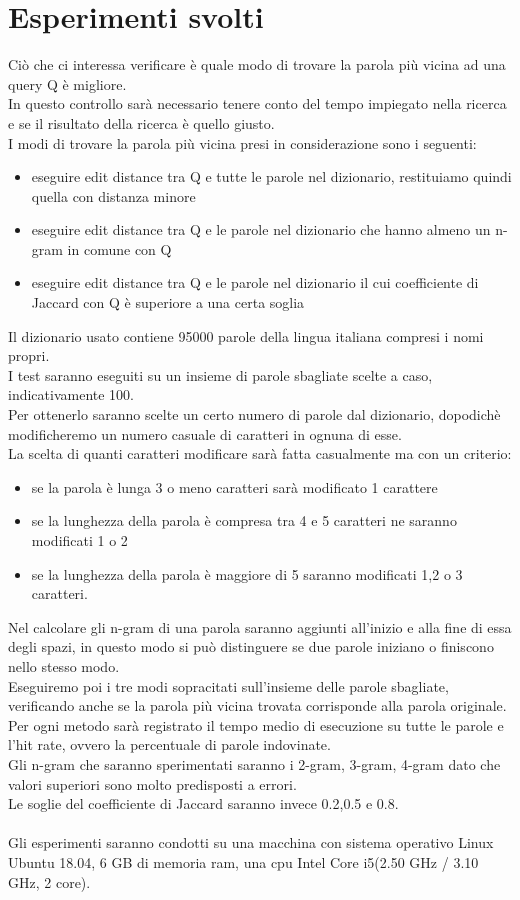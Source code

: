 \documentclass[]{article}
\begin{document}
\section{Esperimenti svolti}
Ciò che ci interessa verificare è quale modo di trovare la parola più vicina ad una query Q è migliore.\\
In questo controllo sarà necessario tenere conto del tempo impiegato nella ricerca e se il risultato della ricerca è quello giusto.\\
I modi di trovare la parola più vicina presi in considerazione sono i seguenti:\\
\begin{itemize}
\item eseguire edit distance tra Q e tutte le parole nel dizionario, restituiamo quindi quella con distanza minore
\item eseguire edit distance tra Q e le parole nel dizionario che hanno almeno un n-gram in comune con Q
\item eseguire edit distance tra Q e le parole nel dizionario il cui coefficiente di Jaccard con Q è superiore a una certa soglia
\end{itemize}
Il dizionario usato contiene 95000 parole della lingua italiana compresi i nomi propri.\\
I test saranno eseguiti su un insieme di parole sbagliate scelte a caso, indicativamente 100.\\
Per ottenerlo saranno scelte un certo numero di parole dal dizionario, dopodichè modificheremo un numero casuale di caratteri in ognuna di esse.\\
La scelta di quanti caratteri modificare sarà fatta casualmente ma con un criterio:
\begin{itemize}
\item se la parola è lunga 3 o meno caratteri sarà modificato 1 carattere
\item se la lunghezza della parola è compresa tra 4 e 5 caratteri ne saranno modificati 1 o 2
\item se la lunghezza della parola è maggiore di 5 saranno modificati 1,2 o 3 caratteri.
\end{itemize}
Nel calcolare gli n-gram di una parola saranno aggiunti all'inizio e alla fine di essa degli spazi, in questo modo si può distinguere se due parole iniziano o finiscono nello stesso modo.\\ 
Eseguiremo poi i tre modi sopracitati sull'insieme delle parole sbagliate, verificando anche se la parola più vicina trovata corrisponde alla parola originale.\\
Per ogni metodo sarà registrato il tempo medio di esecuzione su tutte le parole e l'hit rate, ovvero la percentuale di parole indovinate.\\
Gli n-gram che saranno sperimentati saranno i 2-gram, 3-gram, 4-gram dato che valori superiori sono molto predisposti a errori.\\
Le soglie del coefficiente di Jaccard saranno invece 0.2,0.5 e 0.8.\\\\
Gli esperimenti saranno condotti su una macchina con sistema operativo Linux Ubuntu 18.04, 6 GB di memoria ram, una cpu Intel Core i5(2.50 GHz / 3.10 GHz, 2 core).
\end{document}
